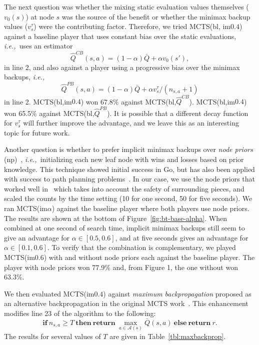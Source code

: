\documentclass[conference]{IEEEtran}
\newcommand{\bQ}{\bar{Q}}
\newcommand{\cA}{\mathcal{A}}
\newcommand{\hQ}{\hat{Q}}
\newcommand{\ie}{{\it i.e.,}~}
\newcounter{mlNoteCounter}
\newcommand{\mlnote}[1]{{\scriptsize \color{darkgreen} $\blacksquare$ \refstepcounter{mlNoteCounter}\textsf{[ML]$_{\arabic{mlNoteCounter}}$:{#1}}}}
\begin{document}
 
The next question was whether the mixing static evaluation values themselves ($v_0(s)$) at node $s$ 
was the source of the benefit or whether the minimax backup values ($v^{\tau}_s$) were the contributing factor.
Therefore, we tried MCTS(bl, im$0.4$) against a baseline player that uses constant bias over the static 
evaluations, \ie uses an estimator
\[ \hQ^{CB}(s,a) = (1-\alpha)\bQ + \alpha v_0(s'),\] 
in line 2, and also against a player using a progressive bias over the minimax backups, \ie 
\[ \hQ^{PB}(s,a) = (1-\alpha)\bQ + \alpha v^{\tau}_s/(n_{s,a} + 1)\]
in line 2.
MCTS(bl,im$0.4$) won 67.8\% against MCTS(bl,$\hQ^{CB}$). 
MCTS(bl,im$0.4$) won 65.5\% against MCTS(bl,$\hQ^{PB}$). 
It is possible that a different decay function for $v^{\tau}_s$ will further improve the advantage, and we leave 
this as an interesting topic for future work. 

Another question is whether to prefer implicit minimax backups over {\it node priors} (np)~\cite{Gelly07Combining}, 
\ie initializing each new leaf node with wins and losses based on prior knowledge. This technique showed initial
success in Go, but has also been applied with success to path planning problems~\cite{Eyerich10High}.
In our case, we use the node priors that worked well in~\cite{Lorentz13Breakthrough}
which takes into account the safety of surrounding pieces, and scaled the counts by the 
time setting (10 for one second, 50 for five seconds).
We ran MCTS(im$\alpha$) against the baseline player where both players use node priors. 
The results are shown at the bottom of Figure~\ref{fig:bt-base-alpha}. When combined at one second of 
search time, implicit minimax backups still seem to give an advantage for $\alpha \in [0.5,0.6]$, and at five 
seconds gives an advantage for $\alpha \in [0.1,0.6]$. To verify that the combination is complementary,
we played MCTS(im$0.6$) with and without node priors each against the baseline player. The player with
node priors won 77.9\% and, from Figure 1, the one without won 63.3\%. 

We then evaluated MCTS(im$0.4$) against {\it maximum backpropagation} proposed as an alternative 
backpropagation in the original MCTS work~\cite{Coulom06Efficient}. This enhancement
modifies line 23 of the algorithm to the following: 
\[
\mathbf{if}~n_{s,a} \ge T~\mathbf{then~return}~\max_{a \in \cA(s)} \bQ(s,a)~\mathbf{else~return}~r.
\]
The results for several values of $T$ are given in Table~\ref{tbl:maxbackprop}. 
\end{document}
